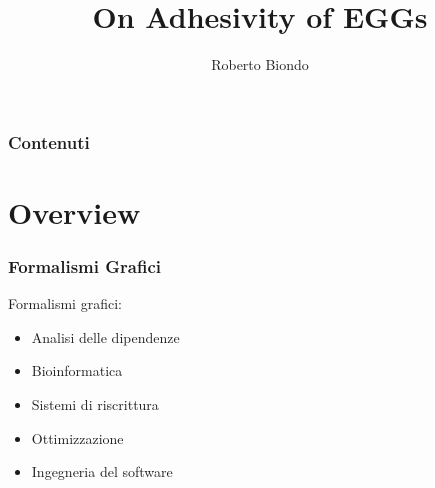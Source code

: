 \documentclass[8pt]{beamer}
\author{Roberto Biondo}
\institute{\small Dipartimento di Informatica\\Università di Pisa}
\title{\textbf{On Adhesivity of EGGs}}
\date{\displaydate{date}}
\begin{document}
\newcommand{\cat}[1]{\mathscr{#1}}
\newcommand{\Ob}{\mathcal{O}b}
\newcommand{\Hom}{\mathcal{H}om}
\newcommand{\Set}{\mathbf{Set}}
\newcommand{\Reg}{\mathcal{R}eg}
\newcommand{\Mono}{\mathcal{M}ono}
\newcommand{\initial}{\mymathbb{0}}
\newcommand{\terminal}{\mathds{1}}
\newcommand{\eqgraph}[1]{\mathbb{#1}}
\newcommand{\EqGrph}{\mathbf{EqGrph}}
\newcommand{\Egg}{\mathbf{EGG}}

\begin{frame}
        \titlepage
\end{frame}


\begin{frame}\frametitle{Contenuti}
        \tableofcontents
\end{frame}


\section{Overview}

\begin{frame}\frametitle{Formalismi Grafici}
	Formalismi grafici:
	\begin{itemize}
		\item Analisi delle dipendenze
		\item Bioinformatica
		\item Sistemi di riscrittura
		\item Ottimizzazione
		\item Ingegneria del software
	\end{itemize}


\end{frame}
\end{document}
